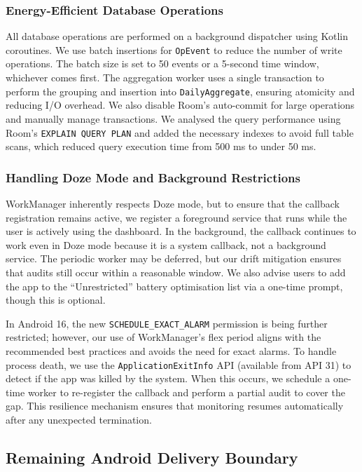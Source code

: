 \subsubsection{Energy-Efficient Database Operations}

All database operations are performed on a background dispatcher using Kotlin coroutines. We use batch insertions for \texttt{OpEvent} to reduce the number of write operations. The batch size is set to 50 events or a 5-second time window, whichever comes first. The aggregation worker uses a single transaction to perform the grouping and insertion into \texttt{DailyAggregate}, ensuring atomicity and reducing I/O overhead. We also disable Room's auto-commit for large operations and manually manage transactions. We analysed the query performance using Room's \texttt{EXPLAIN QUERY PLAN} and added the necessary indexes to avoid full table scans, which reduced query execution time from 500 ms to under 50 ms.

\subsubsection{Handling Doze Mode and Background Restrictions}

WorkManager inherently respects Doze mode, but to ensure that the callback registration remains active, we register a foreground service that runs while the user is actively using the dashboard. In the background, the callback continues to work even in Doze mode because it is a system callback, not a background service. The periodic worker may be deferred, but our drift mitigation ensures that audits still occur within a reasonable window. We also advise users to add the app to the ``Unrestricted'' battery optimisation list via a one-time prompt, though this is optional.

In Android 16, the new \texttt{SCHEDULE\_EXACT\_ALARM} permission is being further restricted; however, our use of WorkManager's flex period aligns with the recommended best practices and avoids the need for exact alarms. To handle process death, we use the \texttt{ApplicationExitInfo} API (available from API 31) to detect if the app was killed by the system. When this occurs, we schedule a one-time worker to re-register the callback and perform a partial audit to cover the gap. This resilience mechanism ensures that monitoring resumes automatically after any unexpected termination.

\subsection{Remaining Android Delivery Boundary}

